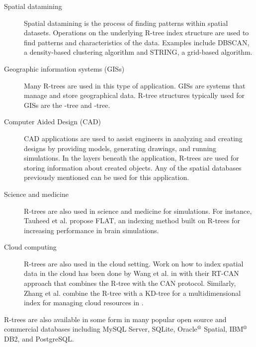 \begin{description}
	\item[Spatial datamining] Spatial datamining is the process of finding
	patterns within spatial datasets. Operations on the underlying R-tree 
	index structure are used to find patterns and characteristics of the 
	data. Examples include DBSCAN\cite{ester1996density}, a density-based 
	clustering algorithm and STRING\cite{wang1997sting}, a grid-based 
	algorithm. 
	\item[Geographic information systems (GISs)] Many R-trees are used in 
	this type of application. GISs are systems that manage and store 
	geographical data. R-tree structures typically used for GISs are the 
	\rbase-tree\cite{guttman84} and \rstar-tree\cite{beckmannkriegelschneiderseeger90}.
	\item[Computer Aided Design (CAD)] CAD applications are used to assist
	engineers in analyzing and creating designs by providing models, 
	generating drawings, and running simulations. In the layers beneath the
	application, R-trees are used for storing information about created 
	objects. Any of the spatial databases previously mentioned can be used 
	for this application. 
	\item[Science and medicine] R-trees are also used in science and 
	medicine for simulations. For instance, Tauheed et al. propose FLAT, an 
	indexing method built on R-trees for increasing performance in brain 
	simulations\cite{tauheed2012accelerating}.
	\item[Cloud computing] R-trees are also used in the cloud setting. Work
	on how to index spatial data in the cloud has been done by Wang et al. in
	 \cite{wang2009retrieving} with their RT-CAN approach that combines the 
	R-tree with the CAN protocol. Similarly, Zhang et al. combine the R-tree
	with a KD-tree for a multidimensional index for managing cloud resources 
	in \cite{zhang2009efficient}.
\end{description}

R-trees are also available in some form in many popular open source and 
commercial databases including MySQL Server, SQLite, Oracle$\textsuperscript{\textregistered}$ Spatial, IBM$\textsuperscript{\textregistered}$ DB2, and 
PostgreSQL. 


